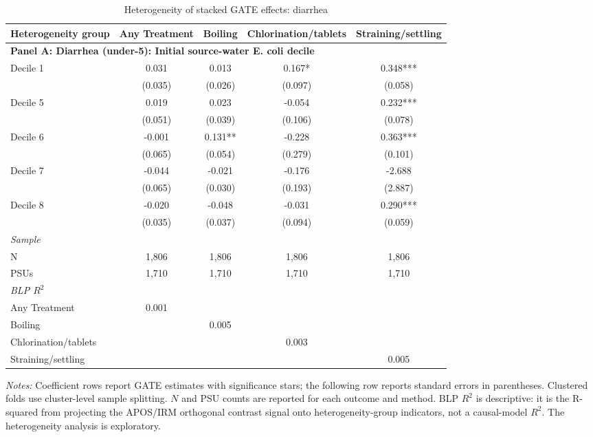 \begin{landscape}
\begin{table}[p]
\centering
\caption{Heterogeneity of stacked GATE effects: diarrhea}
\label{tab:table_gate_main-diarrhea}
\scriptsize\setlength{\tabcolsep}{4pt}
\begin{adjustbox}{max width=\linewidth, center}
\begin{tabular}{lcccc}
\toprule
Heterogeneity group & Any Treatment & Boiling & Chlorination/tablets & Straining/settling \\
\midrule
\multicolumn{5}{l}{\textbf{Panel A: Diarrhea (under-5): Initial source-water E. coli decile}} \\
Decile 1 & 0.031 & 0.013 & 0.167* & 0.348*** \\
 & (0.035) & (0.026) & (0.097) & (0.058) \\
Decile 5 & 0.019 & 0.023 & -0.054 & 0.232*** \\
 & (0.051) & (0.039) & (0.106) & (0.078) \\
Decile 6 & -0.001 & 0.131** & -0.228 & 0.363*** \\
 & (0.065) & (0.054) & (0.279) & (0.101) \\
Decile 7 & -0.044 & -0.021 & -0.176 & -2.688 \\
 & (0.065) & (0.030) & (0.193) & (2.887) \\
Decile 8 & -0.020 & -0.048 & -0.031 & 0.290*** \\
 & (0.035) & (0.037) & (0.094) & (0.059) \\
\multicolumn{5}{l}{\textit{Sample}} \\
\quad N & 1,806 & 1,806 & 1,806 & 1,806 \\
\quad PSUs & 1,710 & 1,710 & 1,710 & 1,710 \\
\multicolumn{5}{l}{\textit{BLP $R^{2}$}} \\
\quad Any Treatment & 0.001 &  &  &  \\
\quad Boiling &  & 0.005 &  &  \\
\quad Chlorination/tablets &  &  & 0.003 &  \\
\quad Straining/settling &  &  &  & 0.005 \\
\bottomrule
\end{tabular}
\end{adjustbox}
\par\vspace{3pt}
\begin{minipage}{\linewidth}\footnotesize \textit{Notes:} Coefficient rows report GATE estimates with significance stars; the following row reports standard errors in parentheses. Clustered folds use cluster-level sample splitting. $N$ and PSU counts are reported for each outcome and method. BLP $R^2$ is descriptive: it is the R-squared from projecting the APOS/IRM orthogonal contrast signal onto heterogeneity-group indicators, not a causal-model $R^2$. The heterogeneity analysis is exploratory.\end{minipage}
\end{table}
\end{landscape}